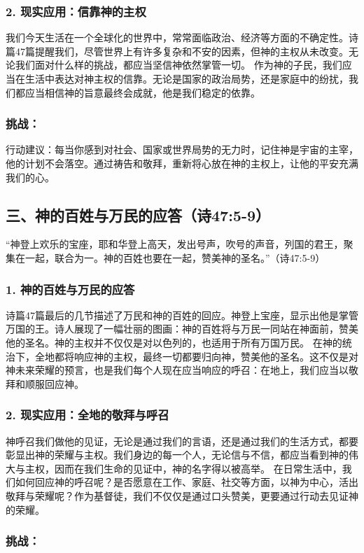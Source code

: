 \documentclass[a4paper, 12pt]{article}
\begin{document}
\subsubsection*{2. 现实应用：信靠神的主权}
我们今天生活在一个全球化的世界中，常常面临政治、经济等方面的不确定性。诗篇47篇提醒我们，尽管世界上有许多复杂和不安的因素，但神的主权从未改变。无论我们面对什么样的挑战，都应当坚信神依然掌管一切。
作为神的子民，我们应当在生活中表达对神主权的信靠。无论是国家的政治局势，还是家庭中的纷扰，我们都应当相信神的旨意最终会成就，他是我们稳定的依靠。
\subsubsection*{挑战：}

行动建议：每当你感到对社会、国家或世界局势的无力时，记住神是宇宙的主宰，他的计划不会落空。通过祷告和敬拜，重新将心放在神的主权上，让他的平安充满我们的心。
\subsection*{三、神的百姓与万民的应答（诗47:5-9）}
“神登上欢乐的宝座，耶和华登上高天，发出号声，吹号的声音，列国的君王，聚集在一起，联合为一。神的百姓也要在一起，赞美神的圣名。”（诗47:5-9）

\subsubsection*{1. 神的百姓与万民的应答}
诗篇47篇最后的几节描述了万民和神的百姓的回应。神登上宝座，显示出他是掌管万国的王。诗人展现了一幅壮丽的图画：神的百姓将与万民一同站在神面前，赞美他的圣名。神的主权并不仅仅是对以色列的，也适用于所有万国万民。
在神的统治下，全地都将响应神的主权，最终一切都要归向神，赞美他的圣名。这不仅是对神未来荣耀的预言，也是我们每个人现在应当响应的呼召：在地上，我们应当以敬拜和顺服回应神。
\subsubsection*{2. 现实应用：全地的敬拜与呼召}
神呼召我们做他的见证，无论是通过我们的言语，还是通过我们的生活方式，都要彰显出神的荣耀与主权。我们身边的每一个人，无论信与不信，都应当看到神的伟大与主权，因而在我们生命的见证中，神的名字得以被高举。
在日常生活中，我们如何回应神的呼召呢？是否愿意在工作、家庭、社交等方面，以神为中心，活出敬拜与荣耀呢？作为基督徒，我们不仅仅是通过口头赞美，更要通过行动去见证神的荣耀。
\subsubsection*{挑战：}
\end{document}
